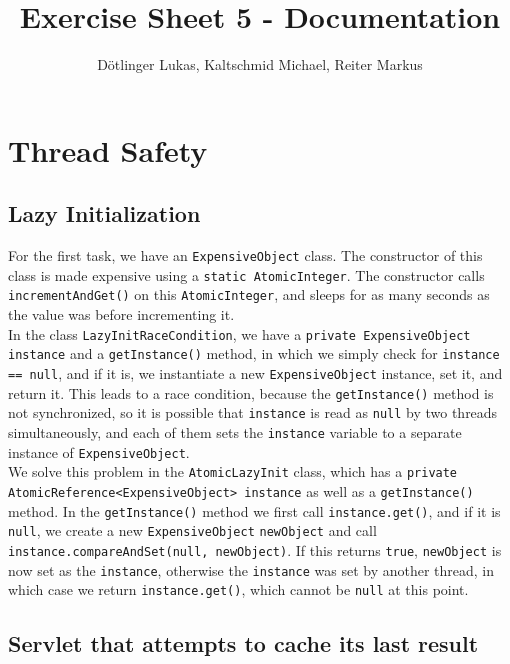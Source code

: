 \documentclass{article}
\title{Exercise Sheet 5 - Documentation}
\date{}
\author{Dötlinger Lukas, Kaltschmid Michael, Reiter Markus}
\begin{document}
  \RaggedRight

  \maketitle

  \section{Thread Safety}

    \subsection{Lazy Initialization}

    For the first task, we have an \texttt{ExpensiveObject} class. The constructor of this class is made expensive using a \texttt{static AtomicInteger}. The constructor calls \texttt{incrementAndGet()} on this \texttt{AtomicInteger}, and sleeps for as many seconds as the value was before incrementing it.
    \\
    In the class \texttt{LazyInitRaceCondition}, we have a \texttt{private ExpensiveObject instance} and a \texttt{getInstance()} method, in which we simply check for \texttt{instance == null}, and if it is, we instantiate a new \texttt{ExpensiveObject} instance, set it, and return it. This leads to a race condition, because the \texttt{getInstance()} method is not synchronized, so it is possible that \texttt{instance} is read as \texttt{null} by two threads simultaneously, and each of them sets the \texttt{instance} variable to a separate instance of \texttt{ExpensiveObject}.
    \\
    We solve this problem in the \texttt{AtomicLazyInit} class, which has a \texttt{private AtomicReference<ExpensiveObject> instance} as well as a \texttt{getInstance()} method. In the \texttt{getInstance()} method we first call \texttt{instance.get()}, and if it is \texttt{null}, we create a new \texttt{ExpensiveObject} \texttt{newObject} and call \\ \texttt{instance.compareAndSet(null, newObject)}. If this returns \texttt{true}, \texttt{newObject} is now set as the \texttt{instance}, otherwise the \texttt{instance} was set by another thread, in which case we return \texttt{instance.get()}, which cannot be \texttt{null} at this point.

    \subsection{Servlet that attempts to cache its last result}
\end{document}

